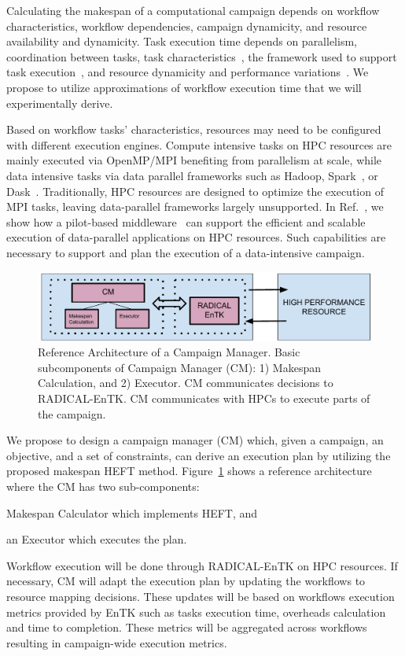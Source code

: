 Calculating the makespan of a computational campaign depends on workflow 
characteristics, workflow dependencies, campaign dynamicity, and resource 
availability and dynamicity. Task execution time depends on parallelism, 
coordination between tasks, task characteristics~\cite{khoshlessan2017parallel}, 
the framework used to support task execution~\cite{paraskevakos2018task}, and 
resource dynamicity and performance 
variations~\cite{paraskevakos2019workflow, pouchard2019computational}. We propose to utilize 
approximations of workflow execution time that we will experimentally derive.

Based on workflow tasks’ characteristics, resources may need to be configured 
with different execution engines. Compute intensive tasks on HPC resources are 
mainly executed via OpenMP/MPI benefiting from parallelism at scale, while data 
intensive tasks via data parallel frameworks such as Hadoop, Spark~\cite{zaharia2010spark}, 
or Dask~\cite{rocklin2015dask}. Traditionally, HPC resources are designed to 
optimize the execution of MPI tasks, leaving data-parallel frameworks largely 
unsupported. In Ref.~\cite{luckow2016hadoop}, we show how a pilot-based 
middleware~\cite{merzky2019using} can support the efficient and scalable execution 
of data-parallel applications on HPC resources. Such capabilities are necessary 
to support and plan the execution of a data-intensive campaign.

\begin{figure}[t]
	\centering
	\includegraphics[width=.85\textwidth]{CEM_RefArch.pdf}
    \caption{Reference Architecture of a Campaign Manager. Basic 
    subcomponents of Campaign Manager (CM): 1) Makespan Calculation, and 2) Executor. 
    CM communicates decisions to RADICAL-EnTK. CM communicates with HPCs to 
    execute parts of the campaign.\vspace{-2.5ex}}\label{refarch}
\end{figure}

We propose to design a campaign manager (CM) which, given a campaign, an objective, 
and a set of constraints, can derive an execution plan by utilizing the proposed 
makespan HEFT method. Figure~\ref{refarch} shows a reference architecture where 
the CM has two sub-components: 
\begin{inparaenum}[(1)]
\item Makespan Calculator which implements HEFT, and 
\item an Executor which executes the plan.
\end{inparaenum}
Workflow execution will be done through RADICAL-EnTK on HPC resources. If necessary, 
CM will adapt the execution plan by updating the workflows to resource mapping 
decisions. These updates will be based on workflows execution metrics provided 
by EnTK such as tasks execution time, overheads calculation and time to completion. 
These metrics will be aggregated across workflows resulting in campaign-wide 
execution metrics.

